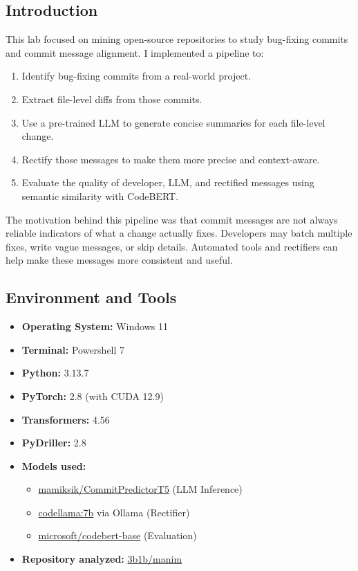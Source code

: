 \documentclass[10pt,a4paper]{report}
\begin{document}
\subsection{Introduction}
This lab focused on mining open-source repositories to study bug-fixing commits and commit message alignment. I implemented a pipeline to:
\begin{enumerate}[itemsep=0.05em, topsep=0pt]
    \item Identify bug-fixing commits from a real-world project.
    \item Extract file-level diffs from those commits.
    \item Use a pre-trained LLM to generate concise summaries for each file-level change.
    \item Rectify those messages to make them more precise and context-aware.
    \item Evaluate the quality of developer, LLM, and rectified messages using semantic similarity with CodeBERT.
\end{enumerate}

The motivation behind this pipeline was that commit messages are not always reliable indicators of what a change actually fixes. Developers may batch multiple fixes, write vague messages, or skip details. Automated tools and rectifiers can help make these messages more consistent and useful.

\subsection{Environment and Tools}
\begin{itemize}[itemsep=0.05em, topsep=0pt]
    \item \textbf{Operating System:} Windows 11
    \item \textbf{Terminal:} Powershell 7
    \item \textbf{Python:} 3.13.7
    \item \textbf{PyTorch:} 2.8 (with CUDA 12.9)
    \item \textbf{Transformers:} 4.56
    \item \textbf{PyDriller:} 2.8
    \item \textbf{Models used:}
    \begin{itemize}[itemsep=0.05em, topsep=0pt]
        \item \href{https://huggingface.co/mamiksik/CommitPredictorT5}{mamiksik/CommitPredictorT5} (LLM Inference)
        \item \href{https://ollama.com/library/codellama}{codellama:7b} via Ollama (Rectifier)
        \item \href{https://huggingface.co/microsoft/codebert-base}{microsoft/codebert-base} (Evaluation)
    \end{itemize}
    \item \textbf{Repository analyzed:} \href{https://github.com/3b1b/manim}{3b1b/manim}
\end{itemize}
\end{document}
